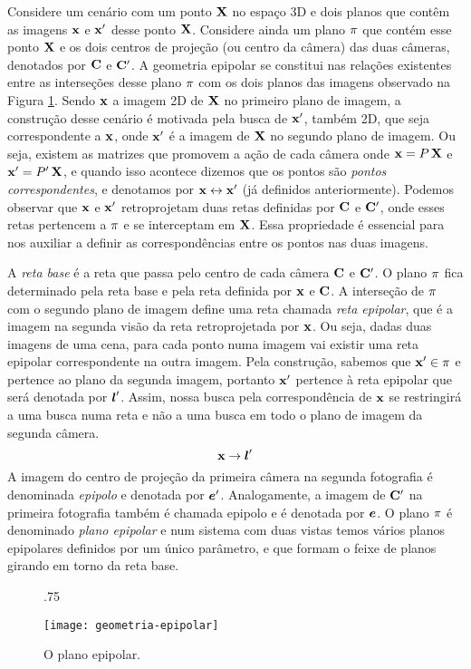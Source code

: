 Considere um cenário com um ponto $\mathbf{X}$ no espaço 3D e dois planos que contêm as imagens $\mathbf{x}$ e $\mathbf{x}'$ desse ponto $\mathbf{X}$. Considere ainda um plano $\pi$ que contém esse ponto $\mathbf{X}$ e os dois centros de projeção (ou centro da câmera) das duas câmeras, denotados por ${\bf C}$ e ${\bf C}'$. A geometria epipolar se constitui nas relações existentes entre as interseções desse plano $\pi$ com os dois planos das imagens observado na Figura \ref{fig.geo-epipolar}. Sendo $\mathbf{x}$ a imagem 2D de $\mathbf{X}$ no primeiro plano de imagem, a construção desse cenário é motivada pela busca de $\mathbf{x}'$, também 2D, que seja correspondente a $\mathbf{x}$, onde $\mathbf{x}'$ é a imagem de $\mathbf{X}$ no segundo plano de imagem. Ou seja, existem as matrizes que promovem a ação de cada câmera onde $\mathbf{x}=P\,\mathbf{X}$ e $\mathbf{x}'=P'\,\mathbf{X}$, e quando isso acontece dizemos que os pontos são {\it pontos correspondentes}, e denotamos por $\mathbf{x}\leftrightarrow\mathbf{x}'$ (já definidos anteriormente). Podemos observar que $\mathbf{x}$ e $\mathbf{x}'$ retroprojetam duas retas definidas por ${\bf C}$ e ${\bf C}'$, onde esses retas pertencem a $\pi$ e se interceptam em $\mathbf{X}$. Essa propriedade é essencial para nos auxiliar a definir as correspondências entre os pontos nas duas imagens. 

A \textit{reta base} é a reta que passa pelo centro de cada câmera ${\bf C}$ e ${\bf C}'$. O plano $\pi$ fica determinado pela reta base e pela reta definida por $\mathbf{x}$ e ${\bf C}$. A interseção de $\pi$ com o segundo plano de imagem define uma reta chamada \textit{reta epipolar}, que é a imagem na segunda visão da reta retroprojetada por $\mathbf{x}$. Ou seja, dadas duas imagens de uma cena, para cada ponto numa imagem vai existir uma reta epipolar correspondente na outra imagem. Pela construção, sabemos que $\mathbf{x}'\in\pi$ e pertence ao plano da segunda imagem, portanto $\mathbf{x}'$ pertence à reta epipolar que será denotada por $\boldsymbol{l}'$. Assim, nossa busca pela correspondência de $\mathbf{x}$ se restringirá a uma busca numa reta e não a uma busca em todo o plano de imagem da segunda câmera. 
\begin{equation*}
\mathbf{x}\rightarrow\boldsymbol{l}'
\end{equation*}
A imagem do centro de projeção da primeira câmera na segunda fotografia é denominada \textit{epipolo} e denotada por $\boldsymbol{e}'$. Analogamente, a imagem de ${\bf C}'$ na primeira fotografia também é chamada epipolo e é denotada por $\boldsymbol{e}$.
O plano $\pi$ é denominado \textit{plano epipolar} e num sistema com duas vistas temos vários planos epipolares definidos por um único parâmetro, e que formam o feixe de planos girando em torno da reta base.
\begin{figure}[!htb]{.75\textwidth}
\caption{O plano epipolar.}
\texttt{[image: geometria-epipolar]}
\label{fig.geo-epipolar}
\end{figure}
